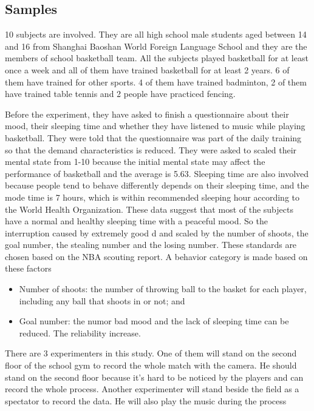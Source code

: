 \documentclass{article}
\begin{document}
\subsection{Samples}
10 subjects are involved. They are all high school male students aged between 14 and 16 from Shanghai Baoshan World Foreign Language School and they are the members of school basketball team. All the subjects played basketball for at least once a week and all of them have trained basketball for at least 2 years. 6 of them have trained for other sports. 4 of them have trained badminton, 2 of them have trained table tennis and 2 people have practiced fencing. 

Before the experiment, they have asked to finish a questionnaire about their mood, their sleeping time and whether they have listened to music while playing basketball. They were told that the questionnaire was part of the daily training so that the demand characteristics is reduced. They were asked to scaled their mental state from 1-10 because the initial mental state may affect the performance of basketball \autocite{liuMoodStatusResponse2023} and the average is 5.63. Sleeping time are also involved because people tend to behave differently depends on their sleeping time, and the mode time is 7 hours, which is within recommended sleeping hour according to the World Health Organization. These data suggest that most of the subjects have a normal and healthy sleeping time with a peaceful mood. So the interruption caused by extremely good d and scaled by the number of
shoots, the goal number, the stealing number and the losing number. These
standards are chosen based on the NBA scouting report.\autocite{NBAZhongGuoGuanFangWangZhanQiuYuanZiLiao2024} A behavior category is made based on these factors

\begin{itemize}
\item Number of shoots: the number of throwing ball to the basket for each player, including any ball that shoots in or not; and
\item Goal number: the numor bad mood and the lack of sleeping time can be reduced. The reliability increase.
\end{itemize}

There are 3 experimenters in this study. One of them will stand on the second floor of the school gym to record the whole match with the camera. He should stand on the second floor because it's hard to be noticed by the players and can record the whole process. Another experimenter will stand beside the field as a spectator to record the data. He will also play the music during the process
\end{document}
